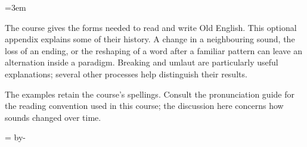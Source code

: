 \BookRecto
\begingroup
\renewcommand{\runningtitle}{Sound history}
\emergencystretch=3em
\newcommand{\reserve}[1]{\par\penalty-100\begingroup\dimen0=\pagegoal\advance\dimen0 by-\pagetotal\ifdim\dimen0<#1\newpage\fi\endgroup}

\raggedright
The course gives the forms needed to read and write Old English. This optional appendix explains some of their history. A change in a neighbouring sound, the loss of an ending, or the reshaping of a word after a familiar pattern can leave an alternation inside a paradigm. Breaking and umlaut are particularly useful explanations; several other processes help distinguish their results.\par
The examples retain the course’s spellings. Consult the pronunciation guide for the reading convention used in this course; the discussion here concerns how sounds changed over time.\par
\reserve{5\baselineskip}
